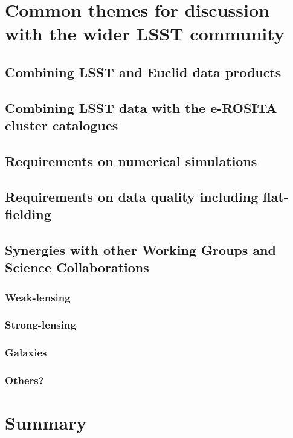\documentclass[a4paper,11pt]{article}
\begin{document}
\section{Common themes for discussion with the wider LSST community}

\subsection{Combining LSST and Euclid data products}

\subsection{Combining LSST data with the e-ROSITA cluster catalogues}

\subsection{Requirements on numerical simulations}

\subsection{Requirements on data quality including flat-fielding}

\subsection{Synergies with other Working Groups and Science Collaborations}

\subsubsection{Weak-lensing}

\subsubsection{Strong-lensing}

\subsubsection{Galaxies}

\subsubsection{Others?}

\section{Summary}
\end{document}
